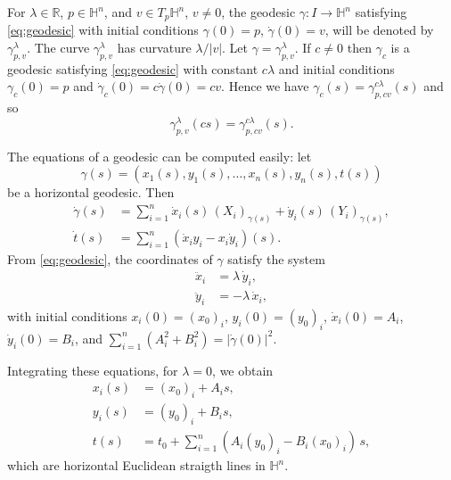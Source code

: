 \documentclass[10pt]{amsart}
\theoremstyle{definition}
\theoremstyle{remark}
\numberwithin{equation}{section}
\begin{document}
For ${\lambda}\in{{\mathbb{R}}}$, $p\in{{\mathbb{H}}}^n$, and $v\in T_{p}{{\mathbb{H}}}^n$, $v\neq 0$, the geodesic ${\gamma}:I\to{{\mathbb{H}}}^n$ satisfying \eqref{eq:geodesic} with initial conditions ${\gamma}(0)=p$, $\dot{\gamma}(0)=v$, will be denoted by ${\gamma}_{p,v}^{\lambda}$. The curve ${\gamma}_{p,v}^{\lambda}$ has curvature ${\lambda}/|v|$. Let ${\gamma}={\gamma}_{p,v}^{\lambda}$. If $c\neq 0$ then ${\gamma}_c$ is a geodesic satisfying \eqref{eq:geodesic} with constant $c{\lambda}$ and initial conditions ${\gamma}_c(0)=p$ and ${\dot{\gamma}}_c(0)=c{\dot{\gamma}}(0)=cv$. Hence we have ${\gamma}_c(s)={\gamma}_{p,cv}^{c{\lambda}}(s)$ and so
\begin{equation}
\label{eq:geodrelation}
{\gamma}_{p,v}^{\lambda}(cs)={\gamma}_{p,cv}^{c{\lambda}}(s).
\end{equation}

The equations of a geodesic can be computed easily: let 
\[
{\gamma}(s)=(x_{1}(s), y_{1}(s), \ldots, x_{n}(s), y_{n}(s), t(s))
\]
be a 
horizontal geodesic. Then
\begin{align*}
\dot{\gamma}(s)&=\sum_{i=1}^n \dot{x}_{i}(s)\,(X_{i})_{{\gamma}(s)}
+\dot{y}_{i}(s)\,(Y_{i})_{{\gamma}(s)},
\\
\dot{t}(s)&=\sum_{i=1}^n (\dot{x}_{i} y_{i}-x_{i}\dot{y}_{i})(s).
\end{align*}
From \eqref{eq:geodesic}, the coordinates of ${\gamma}$ satisfy the system 
\begin{align*}
\ddot{x}_{i}&={\lambda}\,\dot{y}_{i},
\\
\ddot{y}_{i}&=-{\lambda}\,\dot{x}_{i},
\end{align*}
with initial conditions $x_{i}(0)=(x_{0})_{i}$,
$y_{i}(0)=(y_{0})_{i}$, $\dot{x}_{i}(0)=A_{i}$,
$\dot{y}_{i}(0)=B_{i}$, and $\sum_{i=1}^n (A_{i}^2+B_{i}^2)=|{\dot{\gamma}}(0)|^2$.

Integrating these equations, for ${\lambda}=0$, we obtain
\begin{align*}
x_{i}(s)&=(x_{0})_{i}+A_{i}s, \\
y_{i}(s)&=(y_{0})_{i}+B_{i}s, \\
t(s)&=t_{0}+\sum_{i=1}^n (A_{i}(y_{0})_{i}-B_{i}(x_{0})_{i})\,s,
\end{align*}
which are horizontal Euclidean straigth lines in ${{\mathbb{H}}}^n$.
\end{document}
